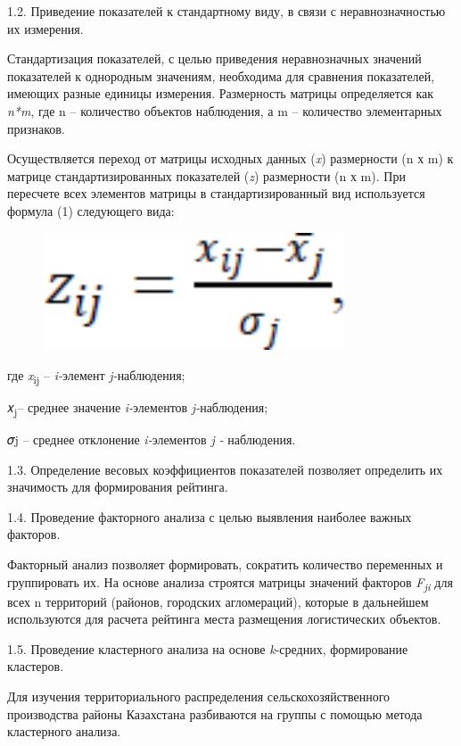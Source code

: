 1.2. Приведение показателей к стандартному виду, в связи с
неравнозначностью их измерения.

Стандартизация показателей, с целью приведения неравнозначных значений
показателей к однородным значениям, необходима для сравнения
показателей, имеющих разные единицы измерения. Размерность матрицы
определяется как \emph{n*m}, где n -- количество объектов наблюдения, а
m -- количество элементарных признаков.

Осуществляется переход от матрицы исходных данных (\emph{x}) размерности
(n х m) к матрице стандартизированных показателей (\emph{z}) размерности
(n х m). При пересчете всех элементов матрицы в стандартизированный вид
используется формула (1) следующего вида:

\begin{figure}[H]
	\centering
	\includegraphics[width=0.8\textwidth]{media/ekon2/image9}
	\caption*{}
\end{figure}


где \emph{x}\textsubscript{ij} -- \emph{i-}элемент \emph{j-}наблюдения;

𝑥\textsubscript{j}-- среднее значение \emph{i-}элементов
\emph{j-}наблюдения;

𝜎j -- среднее отклонение \emph{i-}элементов \emph{j -} наблюдения.

1.3. Определение весовых коэффициентов показателей позволяет определить
их значимость для формирования рейтинга.

1.4. Проведение факторного анализа с целью выявления наиболее важных
факторов.

Факторный анализ позволяет формировать, сократить количество переменных
и группировать их. На основе анализа строятся матрицы значений факторов
\emph{F\textsubscript{ji}} для всех n территорий (районов, городских
агломераций), которые в дальнейшем используются для расчета рейтинга
места размещения логистических объектов.

1.5. Проведение кластерного анализа на основе \emph{k}-средних,
формирование кластеров.

Для изучения территориального распределения сельскохозяйственного
производства районы Казахстана разбиваются на группы с помощью метода
кластерного анализа.

